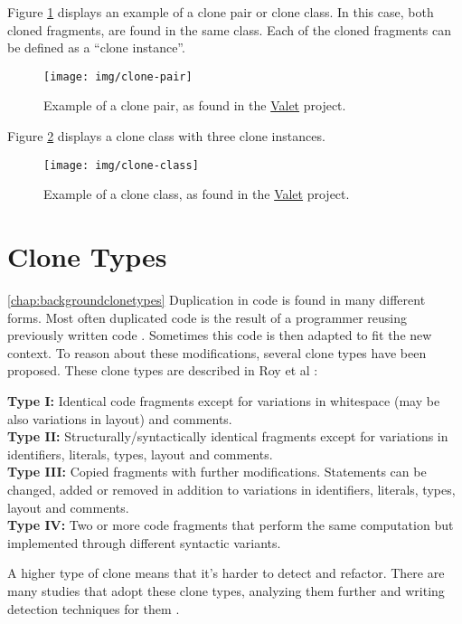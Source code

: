 Figure \ref{fig:clonepair} displays an example of a clone pair or clone class. In this case, both cloned fragments, are found in the same class. Each of the cloned fragments can be defined as a ``clone instance''.

\begin{figure}[H]
	\centering
	\texttt{[image: img/clone-pair]}
	\caption{Example of a clone pair, as found in the \href{https://github.com/Widen/valet}{Valet} project.}
	\label{fig:clonepair}
\end{figure}

Figure \ref{fig:cloneclass} displays a clone class with three clone instances.

\begin{figure}[H]
	\centering
	\texttt{[image: img/clone-class]}
	\caption{Example of a clone class, as found in the \href{https://github.com/Widen/valet}{Valet} project.}
	\label{fig:cloneclass}
\end{figure}

\section{Clone Types} \ref{chap:backgroundclonetypes}
Duplication in code is found in many different forms. Most often duplicated code is the result of a programmer reusing previously written code \cite{haefliger2008code, baxter1998clone}. Sometimes this code is then adapted to fit the new context. To reason about these modifications, several clone types have been proposed. These clone types are described in Roy et al \cite{roy2007survey}:
\begin{displayquote}
\textbf{Type I:} Identical code fragments except for variations in whitespace (may be also variations in layout) and comments.\\
\textbf{Type II:} Structurally/syntactically identical fragments except for variations in identifiers, literals, types, layout and comments.\\
\textbf{Type III:} Copied fragments with further modifications. Statements can be changed, added or removed in addition to variations in identifiers, literals, types, layout and comments.\\
\textbf{Type IV:} Two or more code fragments that perform the same computation but implemented through different syntactic variants.
\end{displayquote}
A higher type of clone means that it's harder to detect and refactor. There are many studies that adopt these clone types, analyzing them further and writing detection techniques for them \cite{sajnani2016sourcerercc, kodhai2010detection, van2019novel}.

